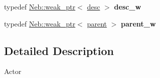 \begin{DoxyCompactItemize}
\item 
\hypertarget{namespaceNeb_1_1Actor_ac603fe9e781b5144d265d79465517bc6}{typedef \hyperlink{classNeb_1_1weak__ptr}{\-Neb\-::weak\-\_\-ptr}$<$ \hyperlink{classNeb_1_1Actor_1_1desc}{desc} $>$ {\bfseries desc\-\_\-w}}\label{namespaceNeb_1_1Actor_ac603fe9e781b5144d265d79465517bc6}

\item 
\hypertarget{namespaceNeb_1_1Actor_a2af6911fc9dbf37f305439efed56e1e8}{typedef \hyperlink{classNeb_1_1weak__ptr}{\-Neb\-::weak\-\_\-ptr}$<$ \hyperlink{classNeb_1_1Actor_1_1parent}{parent} $>$ {\bfseries parent\-\_\-w}}\label{namespaceNeb_1_1Actor_a2af6911fc9dbf37f305439efed56e1e8}

\end{DoxyCompactItemize}



\subsection{\-Detailed \-Description}
\-Actor 